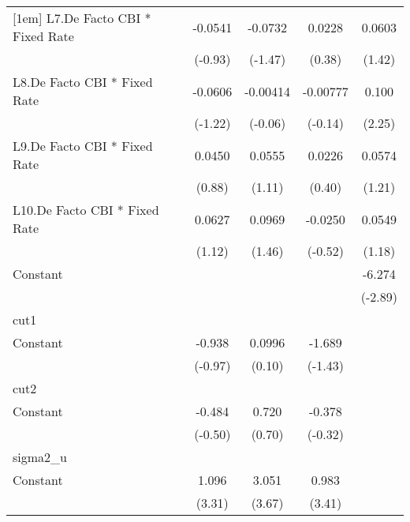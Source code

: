 {\begin{longtable}{l*{4}{c}}
[1em]
L7.De Facto CBI * Fixed Rate&  -0.0541         &  -0.0732         &   0.0228         &   0.0603         \\
                &  (-0.93)         &  (-1.47)         &   (0.38)         &   (1.42)         \\
[1em]
L8.De Facto CBI * Fixed Rate&  -0.0606         & -0.00414         & -0.00777         &    0.100\sym{*}  \\
                &  (-1.22)         &  (-0.06)         &  (-0.14)         &   (2.25)         \\
[1em]
L9.De Facto CBI * Fixed Rate&   0.0450         &   0.0555         &   0.0226         &   0.0574         \\
                &   (0.88)         &   (1.11)         &   (0.40)         &   (1.21)         \\
[1em]
L10.De Facto CBI * Fixed Rate&   0.0627         &   0.0969         &  -0.0250         &   0.0549         \\
                &   (1.12)         &   (1.46)         &  (-0.52)         &   (1.18)         \\
[1em]
Constant        &                  &                  &                  &   -6.274\sym{**} \\
                &                  &                  &                  &  (-2.89)         \\
\hline
cut1            &                  &                  &                  &                  \\
Constant        &   -0.938         &   0.0996         &   -1.689         &                  \\
                &  (-0.97)         &   (0.10)         &  (-1.43)         &                  \\
\hline
cut2            &                  &                  &                  &                  \\
Constant        &   -0.484         &    0.720         &   -0.378         &                  \\
                &  (-0.50)         &   (0.70)         &  (-0.32)         &                  \\
\hline
sigma2\_u        &                  &                  &                  &                  \\
Constant        &    1.096\sym{***}&    3.051\sym{***}&    0.983\sym{***}&                  \\
                &   (3.31)         &   (3.67)         &   (3.41)         &                  \\

\end{longtable}}
